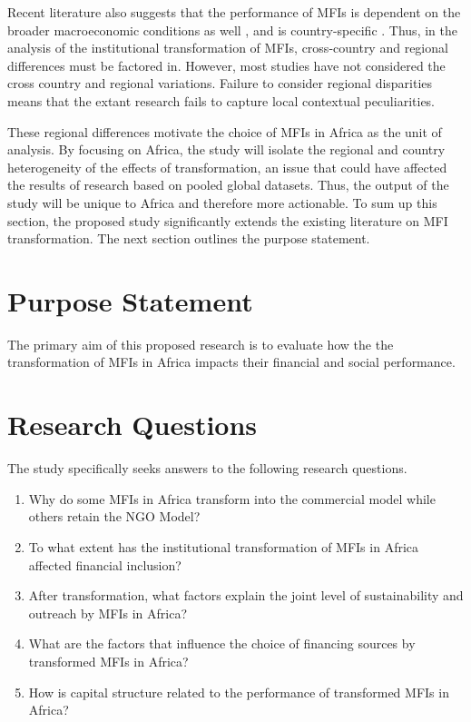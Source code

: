 \documentclass[a4paper,nobind]{templates/ociamthesis}
\providecommand{\tightlist}{%
  \setlength{\itemsep}{0pt}\setlength{\parskip}{0pt}}
\begin{document}
Recent literature also suggests that the performance of MFIs is dependent on the broader macroeconomic conditions as well \textcite{ahlin2011does}, and is country-specific \autocite{d2017ngos}. Thus, in the analysis of the institutional transformation of MFIs, cross-country and regional differences must be factored in. However, most studies have not considered the cross country and regional variations. Failure to consider regional disparities means that the extant research fails to capture local contextual peculiarities.

These regional differences motivate the choice of MFIs in Africa as the unit of analysis. By focusing on Africa, the study will isolate the regional and country heterogeneity of the effects of transformation, an issue that could have affected the results of research based on pooled global datasets. Thus, the output of the study will be unique to Africa and therefore more actionable. To sum up this section, the proposed study significantly extends the existing literature on MFI transformation. The next section outlines the purpose statement.

\hypertarget{purpose-statement}{%
\section{Purpose Statement}\label{purpose-statement}}

\noindent The primary aim of this proposed research is to evaluate how the the transformation of MFIs in Africa impacts their financial and social performance.

\hypertarget{research-questions}{%
\section{Research Questions}\label{research-questions}}

\noindent The study specifically seeks answers to the following research questions.

\begin{enumerate}
\def\labelenumi{\arabic{enumi}.}
\tightlist
\item
  Why do some MFIs in Africa transform into the commercial model while others retain the NGO Model?
\item
  To what extent has the institutional transformation of MFIs in Africa affected financial inclusion?
\item
  After transformation, what factors explain the joint level of sustainability and outreach by MFIs in Africa?
\item
  What are the factors that influence the choice of financing sources by transformed MFIs in Africa?
\item
  How is capital structure related to the performance of transformed MFIs in Africa?
\end{enumerate}
\end{document}
